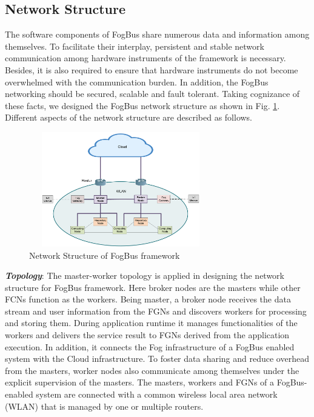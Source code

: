 \documentclass[final,5p,times,twocolumn]{elsarticle}
\begin{document}
\subsection{Network Structure}
The software components of FogBus share numerous data and information among themselves. To facilitate their interplay, persistent and stable network communication among hardware instruments of the framework is necessary. Besides, it is also required to ensure that hardware instruments do not become overwhelmed with the communication burden. In addition, the FogBus networking should be secured, scalable and fault tolerant. Taking cognizance of these facts, we designed the FogBus network structure as shown in Fig. \ref{Fig:network}. Different aspects of the network structure are described as follows. 
%
\begin{figure}[!t]
\centering 
\includegraphics[width=80mm, height=50mm]{Network.png}
\caption{Network Structure of FogBus framework}
\label{Fig:network}
\end{figure} 
% 
\par \textbf{\textit{Topology}}: The master-worker topology is applied in designing the network structure for FogBus framework. Here broker nodes are the masters while other FCNs function as the workers. Being master, a broker node receives the data stream and user information from the FGNs and discovers workers for processing and storing them. During application runtime it manages functionalities of the workers and delivers the service result to FGNs derived from the application execution. In addition, it connects the Fog infrastructure of a FogBus enabled system with the Cloud infrastructure. To foster data sharing and reduce overhead from the masters, worker nodes also communicate among themselves under the explicit supervision of the masters. The masters, workers and FGNs of a FogBus-enabled system are connected with a common wireless local area network (WLAN) that is managed by one or multiple routers. 
%
\end{document}
